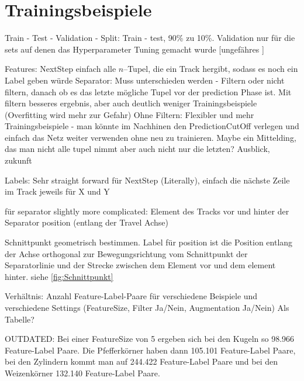 \section{Trainingsbeispiele}

Train - Test - Validation - Split:
Train - test, 90\% zu 10\%.
Validation nur für die sets auf denen das Hyperparameter Tuning gemacht wurde
[ungefähres ]


Features:
NextStep einfach alle \(n\)--Tupel, die ein Track hergibt, sodass es noch ein Label geben würde
Separator: Muss unterschieden werden - Filtern oder nicht filtern, danach ob es das letzte mögliche Tupel vor der prediction Phase ist.
Mit filtern besseres ergebnis, aber auch deutlich weniger Trainingsbeispiele (Overfitting wird mehr zur Gefahr)
Ohne Filtern: Flexibler und mehr Trainingsbeispiele - man könnte im Nachhinen den PredictionCutOff verlegen 
und einfach das Netz weiter verwenden ohne neu zu trainieren.
Maybe ein Mittelding, das man nicht alle tupel nimmt aber auch nicht nur die letzten? Ausblick, zukunft



Labels:
Sehr straight forward für NextStep (Literally), einfach die nächste Zeile im Track jeweils für X und Y

für separator slightly more complicated: 
Element des Tracks vor und hinter der Separator position (entlang der Travel Achse)

Schnittpunkt geometrisch bestimmen.
Label für position ist die Position entlang der Achse orthogonal zur Bewegungsrichtung vom Schnittpunkt der Separatorlinie und 
der Strecke zwischen dem Element vor und dem element hinter. siehe \ref{fig:Schnittpunkt}





Verhältnis: Anzahl Feature-Label-Paare für verschiedene Beispiele und verschiedene Settings
(FeatureSize, Filter Ja/Nein, Augmentation Ja/Nein) Als Tabelle?

OUTDATED:
Bei einer FeatureSize von 5 ergeben sich bei den Kugeln so 98.966 Feature-Label Paare.
Die Pfefferkörner haben dann 105.101 Feature-Label Paare,
bei den Zylindern kommt man auf 244.422 Feature-Label Paare
und bei den Weizenkörner 132.140 Feature-Label Paare.
